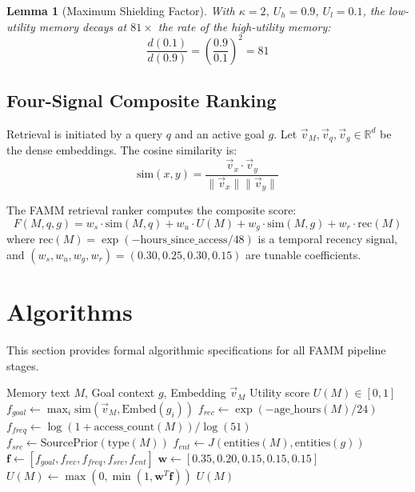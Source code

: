 \documentclass[conference]{IEEEtran}
\newtheorem{lemma}[theorem]{Lemma}
\begin{document}
\begin{lemma}[Maximum Shielding Factor]
\label{lem:shielding}
With $\kappa = 2$, $U_h = 0.9$, $U_l = 0.1$, the low-utility memory decays at $81\times$ the rate of the high-utility memory:
\begin{equation}
\frac{d(0.1)}{d(0.9)} = \left(\frac{0.9}{0.1}\right)^{2} = 81
\end{equation}
\end{lemma}

\subsection{Four-Signal Composite Ranking}
Retrieval is initiated by a query $q$ and an active goal $g$. Let $\vec{v}_M, \vec{v}_q, \vec{v}_g \in \mathbb{R}^d$ be the dense embeddings. The cosine similarity is:
\begin{equation}
\label{eq:cosine}
\text{sim}(x, y) = \frac{\vec{v}_x \cdot \vec{v}_y}{\|\vec{v}_x\|\|\vec{v}_y\|}
\end{equation}

The FAMM retrieval ranker computes the composite score:
\begin{equation}
\label{eq:composite}
F(M, q, g) = w_s \!\cdot\! \text{sim}(M, q) + w_u \!\cdot\! U(M) + w_g \!\cdot\! \text{sim}(M, g) + w_r \!\cdot\! \text{rec}(M)
\end{equation}
where $\text{rec}(M) = \exp(-\text{hours\_since\_access}/48)$ is a temporal recency signal, and $(w_s, w_u, w_g, w_r) = (0.30, 0.25, 0.30, 0.15)$ are tunable coefficients.

\section{Algorithms}
\label{sec:algorithms}

This section provides formal algorithmic specifications for all FAMM pipeline stages.

\begin{algorithm}[H]
\caption{Future Utility Scoring (Heuristic Mode)}
\label{alg:predictor}
\begin{algorithmic}[1]
\REQUIRE Memory text $M$, Goal context $g$, Embedding $\vec{v}_M$
\ENSURE Utility score $U(M) \in [0, 1]$
\STATE $f_{goal} \leftarrow \max_i \text{sim}(\vec{v}_M, \text{Embed}(g_i))$
\STATE $f_{rec} \leftarrow \exp(-\text{age\_hours}(M) / 24)$
\STATE $f_{freq} \leftarrow \log(1 + \text{access\_count}(M)) / \log(51)$
\STATE $f_{src} \leftarrow \text{SourcePrior}(\text{type}(M))$
\STATE $f_{ent} \leftarrow J(\text{entities}(M), \text{entities}(g))$
\STATE $\mathbf{f} \leftarrow [f_{goal}, f_{rec}, f_{freq}, f_{src}, f_{ent}]$
\STATE $\mathbf{w} \leftarrow [0.35, 0.20, 0.15, 0.15, 0.15]$
\STATE $U(M) \leftarrow \max(0, \min(1, \mathbf{w}^T \mathbf{f}))$
\RETURN $U(M)$
\end{algorithmic}
\end{algorithm}
\end{document}
